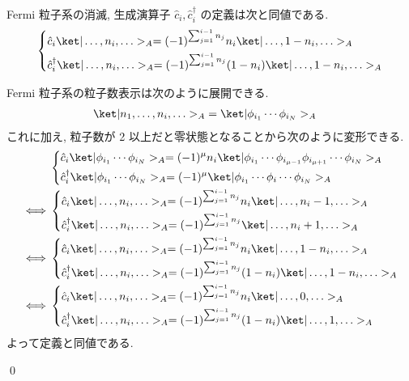 \documentclass[uplatex,dvipdfmx,a4paper,11pt]{jlreq}
\makeatletter
\numberwithin{equation}{section}
\theoremstyle{definition}
\renewenvironment{proof}[1][\proofname]{\par
  \normalfont
  \topsep6\p@\@plus6\p@ \trivlist
  \item[\hskip\labelsep{\bfseries #1}\@addpunct{\bfseries}]\ignorespaces\quad\par
}{
  \qed\endtrivlist\@endpefalse
}
\renewcommand\proofname{証明}
\makeatother
\begin{document}
\begin{theorem}[Q21-51]
  Fermi 粒子系の消滅, 生成演算子 $\hat{c}_i, \hat{c}_i^\dagger$ の定義は次と同値である.
  \begin{align}
    \begin{dcases}
      \hat{c}_i\ket|\ldots,n_i,\ldots>_A = (-1)^{\sum_{j=1}^{i-1}n_j} n_i\ket|\ldots,1-n_i,\ldots>_A \\
      \hat{c}_i^\dagger\ket|\ldots,n_i,\ldots>_A = (-1)^{\sum_{j=1}^{i-1}n_j}(1-n_i)\ket|\ldots,1-n_i,\ldots>_A
    \end{dcases}
  \end{align}
\end{theorem}
\begin{proof}
  Fermi 粒子系の粒子数表示は次のように展開できる.
  \begin{align}
    \ket|n_1,\ldots,n_i,\ldots>_A & = \ket|\phi_{i_1}\cdots\phi_{i_N}>_A
  \end{align}
  これに加え, 粒子数が 2 以上だと零状態となることから次のように変形できる.
  \begin{align}
     & \begin{dcases}
         \hat{c}_i\ket|\phi_{i_1}\cdots\phi_{i_N}>_A = (-1)^\mu n_i\ket|\phi_{i_1}\cdots\phi_{i_{\mu-1}}\phi_{i_{\mu+1}}\cdots\phi_{i_N}>_A \\
         \hat{c}_i^\dagger\ket|\phi_{i_1}\cdots\phi_{i_N}>_A = (-1)^\mu\ket|\phi_{i_1}\cdots\phi_i\cdots\phi_{i_N}>_A
       \end{dcases} \\
    \iff
     & \begin{dcases}
         \hat{c}_i\ket|\ldots,n_i,\ldots>_A = (-1)^{\sum_{j=1}^{i-1}n_j} n_i\ket|\ldots,n_i - 1,\ldots>_A \\
         \hat{c}_i^\dagger\ket|\ldots,n_i,\ldots>_A = (-1)^{\sum_{j=1}^{i-1}n_j}\ket|\ldots,n_i + 1,\ldots>_A
       \end{dcases}                                                                  \\
    \iff
     & \begin{dcases}
         \hat{c}_i\ket|\ldots,n_i,\ldots>_A = (-1)^{\sum_{j=1}^{i-1}n_j} n_i\ket|\ldots,1 - n_i,\ldots>_A \\
         \hat{c}_i^\dagger\ket|\ldots,n_i,\ldots>_A = (-1)^{\sum_{j=1}^{i-1}n_j}(1 - n_i)\ket|\ldots,1 - n_i,\ldots>_A
       \end{dcases}                                                         \\
    \iff
     & \begin{dcases}
         \hat{c}_i\ket|\ldots,n_i,\ldots>_A = (-1)^{\sum_{j=1}^{i-1}n_j} n_i\ket|\ldots,0,\ldots>_A \\
         \hat{c}_i^\dagger\ket|\ldots,n_i,\ldots>_A = (-1)^{\sum_{j=1}^{i-1}n_j}(1 - n_i)\ket|\ldots,1,\ldots>_A
       \end{dcases}
  \end{align}
  よって定義と同値である.
\end{proof}
\end{document}
